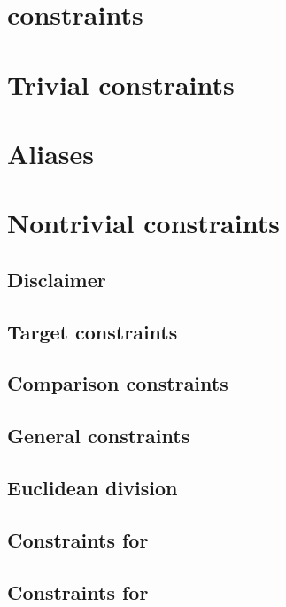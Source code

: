 \section{\oli{} constraints}                                    \label{ext: OLI constraints}                              
\section{Trivial constraints}                                   \label{ext: trivial constraints}                          
\section{Aliases}                                               \label{ext: aliases}                                      
\section{Nontrivial constraints}                                \label{ext: nontrivial}
\subsection{Disclaimer}                                         \label{ext: nontrivial: disclaimer}                       
\subsection{Target constraints}                                 \label{ext: nontrivial: target constraints}               
\subsection{Comparison constraints}                             \label{ext: nontrivial: comparison constraints}           
\subsection{General constraints}                                \label{ext: nontrivial: general constraints}              
\subsection{Euclidean division}                                 \label{ext: nontrivial: euclidean division}               
\subsection{Constraints for }                      \label{ext: nontrivial: constraints for ADDMOD}           
\subsection{Constraints for }                      \label{ext: nontrivial: constraints for MULMOD}           
